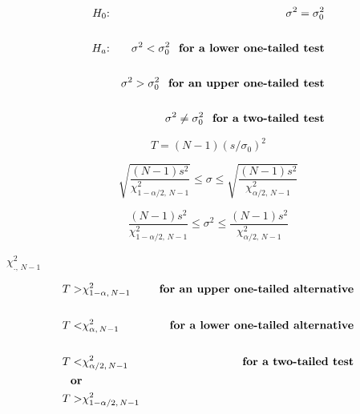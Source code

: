 \documentclass[12pt]{article}
\begin{document}
\pagestyle{empty}
\Large 
{}
\pagecolor{ehandbook}

\boldmath 
\vspace*{-1.75in}
\begin{eqnarray*}
H_0\mbox{:}  & & \sigma^2 = \sigma_0^2 \\   
                    & & \\
H_a\mbox{:}  & & \sigma^2 < \sigma_0^2 \mbox{\bf \,\, for a lower one-tailed test} \\
                    & &    \\
                    & & \sigma^2 > \sigma_0^2 \mbox{\bf \,\, for an upper one-tailed test} \\
                    & &    \\
                    & & \sigma^2 \ne \sigma_0^2 \mbox{\bf \,\, for a two-tailed test} \\
\end{eqnarray*}

\[
T = (N-1)(s/\sigma_0)^2
\]
\vspace*{.05in} 

\[
\sqrt{\frac{(N-1)s^2}{\chi^2_{1-\alpha/2, \, N-1}}} \le \sigma \le \sqrt{\frac{(N-1)s^2}{\chi^2_{\alpha/2, \, N-1}}}
\]
\vspace*{.05in}

\[
\frac{(N-1)s^2}{\chi^2_{1-\alpha/2, \, N-1}} \le \sigma^2 \le \frac{(N-1)s^2}{\chi^2_{\alpha/2, \, N-1}}
\]
\vspace*{.05in}

$\chi^2_{., \, N-1}$ 
 

\begin{eqnarray*}
T  > &  \chi^2_{1-\alpha, \, N-1} &  \mbox{\bf \,\, for an upper one-tailed alternative}  \\   
                 &  &   \\
T  <  & \chi^2_{\alpha, \, N-1} &  \mbox{\bf \,\, for a lower one-tailed alternative} \\
                 &  &      \\
T  < & \chi^2_{\alpha/2, \, N-1} & \mbox{\bf \,\, for a two-tailed test} \\
\mbox{\bf or}                 &  &      \\
T  > & \chi^2_{1-\alpha/2, \, N-1} &  
\end{eqnarray*}
\end{document}
